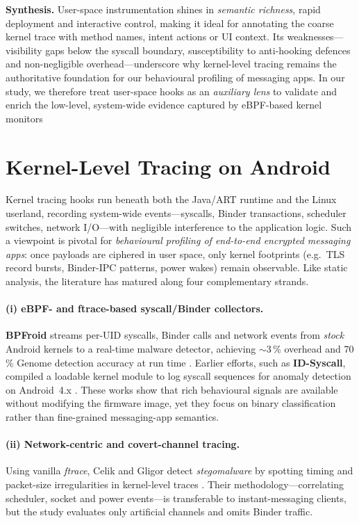 \documentclass[a4paper,12pt]{report}
\begin{document}
\medskip
\noindent\textbf{Synthesis.}
User-space instrumentation shines in \emph{semantic richness}, rapid
deployment and interactive control, making it ideal for annotating the coarse
kernel trace with method names, intent actions or UI context.  Its
weaknesses—visibility gaps below the syscall boundary, susceptibility to
anti-hooking defences and non-negligible overhead—underscore why kernel-level
tracing remains the authoritative foundation for our behavioural profiling of
messaging apps.  In our study, we therefore treat user-space hooks as an
\emph{auxiliary lens} to validate and enrich the low-level, system-wide evidence
captured by eBPF-based kernel monitors

\section{Kernel-Level Tracing on Android}
\label{sec:rw:kernel}

Kernel tracing hooks run beneath both the Java/ART runtime and the Linux
userland, recording system-wide events---syscalls, Binder transactions,
scheduler switches, network I/O---with negligible interference to the
application logic.  Such a viewpoint is pivotal for \emph{behavioural
profiling of end-to-end encrypted messaging apps}: once payloads are
ciphered in user space, only kernel footprints (e.g.\ TLS record bursts,
Binder-IPC patterns, power wakes) remain observable.  Like static analysis,
the literature has matured along four complementary strands.

\paragraph{(i) eBPF- and ftrace-based syscall/Binder collectors.}
\textbf{BPFroid} streams per-UID syscalls, Binder calls and network events
from \emph{stock} Android kernels to a real-time malware detector, achieving
$\sim$3\,\% overhead and 70\,\% Genome detection accuracy at run time
\cite{agman2021bpfroid}.  Earlier efforts, such as \textbf{ID-Syscall},
compiled a loadable kernel module to log syscall sequences for anomaly
detection on Android~4.x \cite{almuttawa2014syscall}.  These works show that
rich behavioural signals are available without modifying the firmware
image, yet they focus on binary classification rather than fine-grained
messaging-app semantics.

\paragraph{(ii) Network-centric and covert-channel tracing.}
Using vanilla \textit{ftrace}, Celik and Gligor detect
\emph{stegomalware} by spotting timing and packet-size irregularities in
kernel-level traces \cite{celik2021stego}.  Their methodology---correlating
scheduler, socket and power events---is transferable to instant-messaging
clients, but the study evaluates only artificial channels and omits Binder
traffic.
\end{document}
